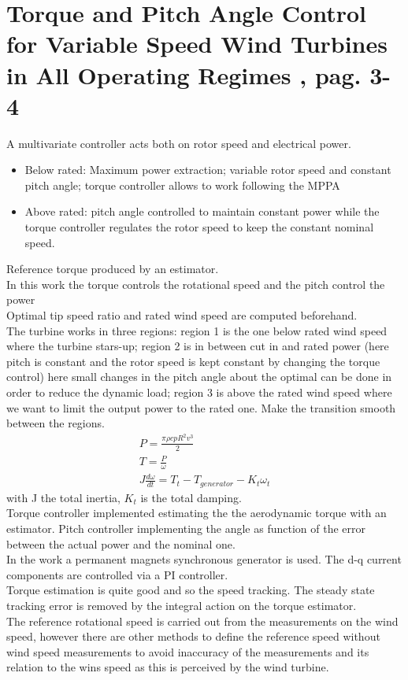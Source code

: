 \documentclass[]{article}
\begin{document}
\tableofcontents
\newpage
\section{Torque and Pitch Angle Control for Variable Speed Wind Turbines in All Operating Regimes \cite{5874598}, pag. 3-4}
A multivariate controller acts both on rotor speed and electrical power. 
\begin{itemize}
	\item Below rated: Maximum power extraction; variable rotor speed and constant pitch angle; torque controller allows to work following the MPPA
	\item Above rated: pitch angle controlled to maintain constant power while the torque controller regulates the rotor speed to keep the constant nominal speed. 
\end{itemize}
Reference torque produced by an estimator.\\
In this work the torque controls the rotational speed and the pitch control the power\\
Optimal tip speed ratio and rated wind speed are computed beforehand. \\
The turbine works in three regions: region 1 is the one below rated wind speed where the turbine stars-up; region 2 is in between cut in and rated power (here pitch is constant and the rotor speed is kept constant by changing the torque control) here small changes in the pitch angle about the optimal can be done in order to reduce the dynamic load; region 3 is above the rated wind speed where we want to limit the output power to the rated one. Make the transition smooth between the regions. \\
\begin{gather}
	P = \frac{\pi \rho cp R^2 v^3}{2}\\
	T = \frac{P}{\omega}\\
	J \frac{d \omega}{d t} = T_{t} - T_{generator} -K_t\omega_t
	\label{eq:dynamic_rotor_gen}
\end{gather}
with J the total inertia, $K_t$ is the total damping.\\
Torque controller implemented estimating the the aerodynamic torque with an estimator. Pitch controller implementing the angle as function of the error between the actual power and the nominal one.\\
In the work a permanent magnets synchronous generator is used. The d-q current components are controlled via a PI controller. \\
Torque estimation is quite good and so the speed tracking. The steady state tracking error is removed by the integral action on the torque estimator.\\
The reference rotational speed is carried out from the measurements on the wind speed, however there are other methods to define the reference speed without wind speed measurements to avoid inaccuracy of the measurements and its relation to the wins speed as this is perceived by the wind turbine.
\newpage
\end{document}
